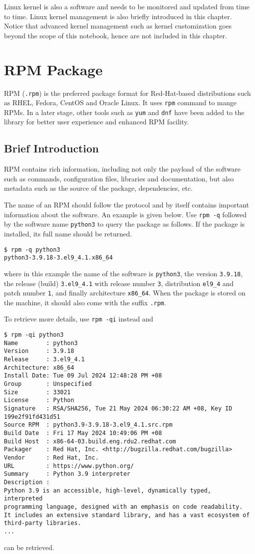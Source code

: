 Linux kernel is also a software and needs to be monitored and updated from time to time. Linux kernel management is also briefly introduced in this chapter. Notice that advanced kernel management such as kernel customization goes beyond the scope of this notebook, hence are not included in this chapter.

\section{RPM Package}

RPM (\verb|.rpm|) is the preferred package format for Red-Hat-based distributions such as RHEL, Fedora, CentOS and Oracle Linux. It uses \verb|rpm| command to mange RPMs. In a later stage, other tools such as \verb|yum| and \verb|dnf| have been added to the library for better user experience and enhanced RPM facility. 

\subsection{Brief Introduction}

RPM contains rich information, including not only the payload of the software such as commands, configuration files, libraries and documentation, but also metadata such as the source of the package, dependencies, etc.

The name of an RPM should follow the protocol and by itself contains important information about the software. An example is given below. Use \verb|rpm -q| followed by the software name \verb|python3| to query the package as follows. If the package is installed, its full name should be returned.
\begin{lstlisting}
$ rpm -q python3
python3-3.9.18-3.el9_4.1.x86_64
\end{lstlisting}
where in this example the name of the software is \verb|python3|, the version \verb|3.9.18|, the release (build) \verb|3.el9_4.1| with release number \verb|3|, distribution \verb|el9_4| and patch number \verb|1|, and finally architecture \verb|x86_64|. When the package is stored on the machine, it should also come with the suffix \verb|.rpm|. 

To retrieve more details, use \verb|rpm -qi| instead and
\begin{lstlisting}
$ rpm -qi python3
Name        : python3
Version     : 3.9.18
Release     : 3.el9_4.1
Architecture: x86_64
Install Date: Tue 09 Jul 2024 12:48:28 PM +08
Group       : Unspecified
Size        : 33021
License     : Python
Signature   : RSA/SHA256, Tue 21 May 2024 06:30:22 AM +08, Key ID 199e2f91fd431d51
Source RPM  : python3.9-3.9.18-3.el9_4.1.src.rpm
Build Date  : Fri 17 May 2024 10:49:06 PM +08
Build Host  : x86-64-03.build.eng.rdu2.redhat.com
Packager    : Red Hat, Inc. <http://bugzilla.redhat.com/bugzilla>
Vendor      : Red Hat, Inc.
URL         : https://www.python.org/
Summary     : Python 3.9 interpreter
Description :
Python 3.9 is an accessible, high-level, dynamically typed, interpreted
programming language, designed with an emphasis on code readability.
It includes an extensive standard library, and has a vast ecosystem of
third-party libraries.
...
\end{lstlisting}
can be retrieved.

